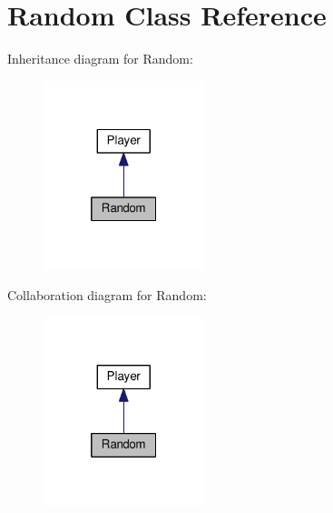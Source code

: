 \hypertarget{classRandom}{}\section{Random Class Reference}
\label{classRandom}


Inheritance diagram for Random\+:
\nopagebreak
\begin{figure}[H]
\begin{center}
\leavevmode
\includegraphics[width=133pt]{classRandom__inherit__graph}
\end{center}
\end{figure}


Collaboration diagram for Random\+:
\nopagebreak
\begin{figure}[H]
\begin{center}
\leavevmode
\includegraphics[width=133pt]{classRandom__coll__graph}
\end{center}
\end{figure}
